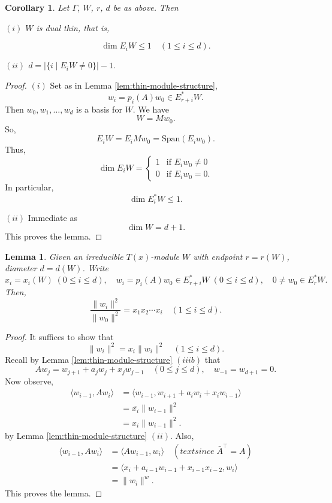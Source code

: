\documentclass[
]{book}
\newtheorem{lemma}{Lemma}[chapter]
\newtheorem{corollary}{Corollary}[chapter]
\theoremstyle{definition}
\theoremstyle{definition}
\theoremstyle{definition}
\theoremstyle{definition}
\theoremstyle{remark}
\begin{document}
\begin{corollary}

Let \(\Gamma\), \(W\), \(r\), \(d\) be as above. Then

\((i)\) \(W\) is dual thin, that is,

\[\dim E_iW \leq 1 \quad (1\leq i \leq d).\]

\((ii)\) \(d = |\{i \mid E_iW \neq 0\}| - 1.\)

\end{corollary}

\begin{proof}
\((i)\) Set as in Lemma \ref{lem:thin-module-structure},
\[w_i = p_i(A)w_0\in E^*_{r+i}W.\]
Then \(w_0, w_1, \ldots, w_d\) is a basis for \(W\). We have
\[W = Mw_0.\]
So,
\[E_iW = E_iMw_0 = \mathrm{Span}(E_iw_0).\]
Thus,
\[\dim E_iW = \begin{cases}1 & \text{if } E_iw_0\neq 0\\ 0 & \text{if }E_iw_0 = 0.\end{cases}\]
In particular,
\[\dim E^*_iW \leq 1.\]

\((ii)\) Immediate as
\[\dim W = d+1.\]
This proves the lemma.
\end{proof}

\begin{lemma}
\protect\hypertarget{lem:measure-wi}{}\label{lem:measure-wi}Given an irreducible \(T(x)\)-module \(W\) with endpoint \(r = r(W)\), diameter \(d = d(W)\). Write
\[x_i = x_i(W) \; (0\leq i\leq d), \quad w_i = p_i(A)w_0\in E^*_{r+i}W \; (0\leq i\leq d), \quad 0\neq w_0 \in E^*_rW.\]
Then,
\[\frac{\|w_i\|^2}{\|w_0\|^2} = x_1x_2\cdots x_i \quad (1\leq i\leq d).\]
\end{lemma}

\begin{proof}
It suffices to show that
\[\|w_i\|^2 = x_i\|w_i\|^2 \quad (1\leq i\leq d).\]
Recall by Lemma \ref{lem:thin-module-structure} \((iiib)\) that
\[Aw_j = w_{j+1} + a_jw_j + x_jw_{j-1} \quad (0\leq j\leq d), \quad w_{-1} = w_{d+1} = 0.\]
Now observe,
\begin{align}
\langle w_{i-1}, Aw_i\rangle & = \langle w_{i-1}, w_{i+1}+ a_iw_i + x_iw_{i-1}\rangle\\
& = \overline{x_i}\|w_{i-1}\|^2\\
& = x_i\|w_{i-1}\|^2.
\end{align}
by Lemma \ref{lem:thin-module-structure} \((ii)\).
Also,
\begin{align}
\langle w_{i-1}, Aw_i\rangle & = \langle Aw_{i-1}, w_i\rangle \quad (text{since}\; \bar{A}^\top = A)\\
& = \langle x_i + a_{i-1}w_{i-1} + x_{i-1}x_{i-2}, w_i\rangle\\
& = \|w_i\|^w.
\end{align}
This proves the lemma.
\end{proof}
\end{document}
